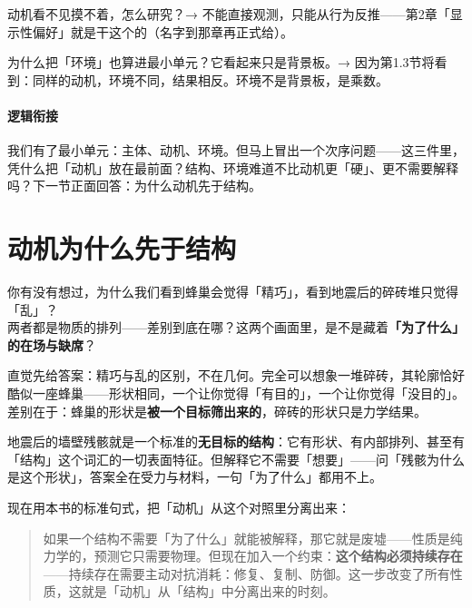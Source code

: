 \documentclass[../../main2.tex]{subfiles}
\begin{document}
	\begin{reader_anticipation}
		\item 动机看不见摸不着，怎么研究？→ 不能直接观测，只能从行为反推——第2章「显示性偏好」就是干这个的（名字到那章再正式给）。
		\item 为什么把「环境」也算进最小单元？它看起来只是背景板。→ 因为第1.3节将看到：同样的动机，环境不同，结果相反。环境不是背景板，是乘数。
	\end{reader_anticipation}

	\paragraph*{逻辑衔接}
	我们有了最小单元：主体、动机、环境。但马上冒出一个次序问题——这三件里，凭什么把「动机」放在最前面？结构、环境难道不比动机更「硬」、更不需要解释吗？下一节正面回答：为什么动机先于结构。

	\section{动机为什么先于结构}
	\label{sec:mot-structure}

	\begin{readingnote}
		你有没有想过，为什么我们看到蜂巢会觉得「精巧」，看到地震后的碎砖堆只觉得「乱」？\\
		两者都是物质的排列——差别到底在哪？这两个画面里，是不是藏着\textbf{「为了什么」的在场与缺席}？
	\end{readingnote}

	直觉先给答案：精巧与乱的区别，不在几何。完全可以想象一堆碎砖，其轮廓恰好酷似一座蜂巢——形状相同，一个让你觉得「有目的」，一个让你觉得「没目的」。差别在于：蜂巢的形状是\textbf{被一个目标筛出来的}，碎砖的形状只是力学结果。

	地震后的墙壁残骸就是一个标准的\textbf{无目标的结构}：它有形状、有内部排列、甚至有「结构」这个词汇的一切表面特征。但解释它不需要「想要」——问「残骸为什么是这个形状」，答案全在受力与材料，一句「为了什么」都用不上。

	现在用本书的标准句式，把「动机」从这个对照里分离出来：

	\begin{quote}
		如果一个结构不需要「为了什么」就能被解释，那它就是废墟——性质是纯力学的，预测它只需要物理。但现在加入一个约束：\textbf{这个结构必须持续存在}——持续存在需要主动对抗消耗：修复、复制、防御。这一步改变了所有性质，这就是「动机」从「结构」中分离出来的时刻。
	\end{quote}
\end{document}

